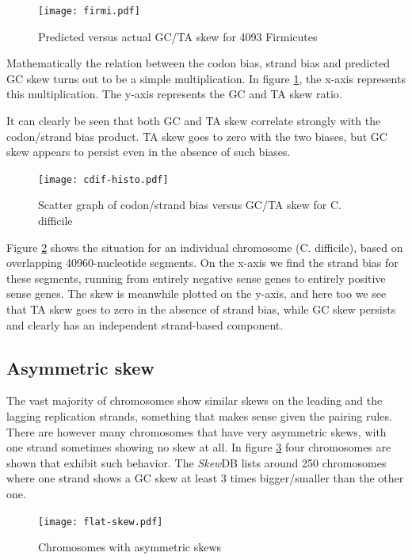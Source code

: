 \documentclass[9pt,twocolumn,twoside]{pnas-new}
\begin{document}
\begin{figure}[ht]
\centering
\texttt{[image: firmi.pdf]}
\caption{Predicted versus actual GC/TA skew for 4093 Firmicutes}
\label{fig:the-big-graph}
\end{figure}


Mathematically the relation between the codon bias, strand bias and predicted GC skew turns out to be a simple multiplication. In figure \ref{fig:the-big-graph}, the x-axis represents this multiplication. The y-axis represents the GC and TA skew ratio. 

It can clearly be seen that both GC and TA skew correlate strongly with the codon/strand bias product. TA skew goes to zero with the two biases, but GC skew appears to persist even in the absence of such biases.

\begin{figure}[ht]
\centering
\texttt{[image: cdif-histo.pdf]}
\caption{Scatter graph of codon/strand bias versus GC/TA skew for C. difficile}
\label{fig:cdif-scatter}
\end{figure}


Figure \ref{fig:cdif-scatter} shows the situation for an individual chromosome (C. difficile), based on overlapping 40960-nucleotide segments. On the x-axis we find the strand bias for these segments, running from entirely negative sense genes to entirely positive sense genes. The skew is meanwhile plotted on the y-axis, and here too we see that TA skew goes to zero in the absence of strand bias, while GC skew persists and clearly has an independent strand-based component.

\subsection*{Asymmetric skew}
The vast majority of chromosomes show similar skews on the leading and the lagging replication strands, something that makes sense given the pairing rules. There are however many chromosomes that have very asymmetric skews, with one strand sometimes showing no skew at all. In figure \ref{fig:asym-skew} four chromosomes are shown that exhibit such behavior. The \emph{Skew}DB lists around 250 chromosomes where one strand shows a GC skew at least 3 times bigger/smaller than the other one.

\begin{figure}[ht]
\centering
\texttt{[image: flat-skew.pdf]}
\caption{Chromosomes with asymmetric skews}
\label{fig:asym-skew}
\end{figure}
\end{document}
